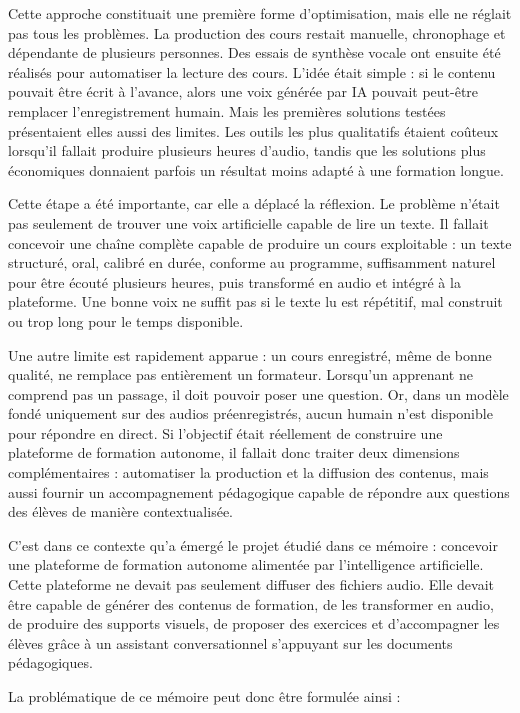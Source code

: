 Cette approche constituait une première forme d'optimisation, mais elle ne réglait pas
tous les problèmes. La production des cours restait manuelle, chronophage et dépendante
de plusieurs personnes. Des essais de synthèse vocale ont ensuite été réalisés pour
automatiser la lecture des cours. L'idée était simple : si le contenu pouvait être écrit à
l'avance, alors une voix générée par IA pouvait peut-être remplacer l'enregistrement
humain. Mais les premières solutions testées présentaient elles aussi des limites. Les
outils les plus qualitatifs étaient coûteux lorsqu'il fallait produire plusieurs heures
d'audio, tandis que les solutions plus économiques donnaient parfois un résultat moins
adapté à une formation longue.

Cette étape a été importante, car elle a déplacé la réflexion. Le problème n'était pas
seulement de trouver une voix artificielle capable de lire un texte. Il fallait concevoir une
chaîne complète capable de produire un cours exploitable : un texte structuré, oral,
calibré en durée, conforme au programme, suffisamment naturel pour être écouté
plusieurs heures, puis transformé en audio et intégré à la plateforme. Une bonne voix ne
suffit pas si le texte lu est répétitif, mal construit ou trop long pour le temps disponible.

Une autre limite est rapidement apparue : un cours enregistré, même de bonne qualité,
ne remplace pas entièrement un formateur. Lorsqu'un apprenant ne comprend pas un
passage, il doit pouvoir poser une question. Or, dans un modèle fondé uniquement sur
des audios préenregistrés, aucun humain n'est disponible pour répondre en direct. Si
l'objectif était réellement de construire une plateforme de formation autonome, il fallait
donc traiter deux dimensions complémentaires : automatiser la production et la diffusion
des contenus, mais aussi fournir un accompagnement pédagogique capable de répondre
aux questions des élèves de manière contextualisée.

C'est dans ce contexte qu'a émergé le projet étudié dans ce mémoire : concevoir une
plateforme de formation autonome alimentée par l'intelligence artificielle. Cette
plateforme ne devait pas seulement diffuser des fichiers audio. Elle devait être capable de
générer des contenus de formation, de les transformer en audio, de produire des supports
visuels, de proposer des exercices et d'accompagner les élèves grâce à un assistant
conversationnel s'appuyant sur les documents pédagogiques.

La problématique de ce mémoire peut donc être formulée ainsi :

